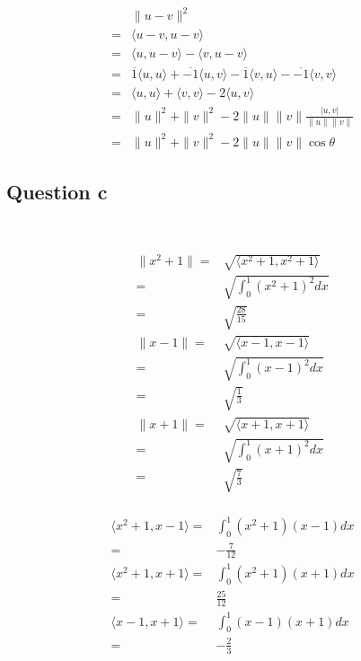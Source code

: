 \documentclass{article}
\begin{document}
~

\begin{equation*}
    \begin{split}
        &\|u-v\|^2\\
        =&\langle u-v,u-v\rangle\\
        =&\langle u,u-v\rangle-\langle v,u-v\rangle\\
        =&\overline{1}\langle u,u\rangle+\overline{-1}\langle u,v\rangle-\overline{1}\langle v,u\rangle-\overline{-1}\langle v,v\rangle\\
        =&\langle u,u\rangle+\langle v,v\rangle-2\langle u,v\rangle\\
        =&\|u\|^2+\|v\|^2-2\|u\|\|v\|\frac{|u,v|}{\|u\|\|v\|}\\
        =&\|u\|^2+\|v\|^2-2\|u\|\|v\|\cos \theta
    \end{split}
\end{equation*}

\subsection{Question c}

~

\begin{equation*}
    \begin{split}
        \|x^2+1\|=&\sqrt{\langle x^2+1,x^2+1\rangle}\\
        =&\sqrt{\int_{0}^{1}(x^2+1)^2dx}\\
        =&\sqrt{\frac{28}{15}}\\
        \|x-1\|=&\sqrt{\langle x-1,x-1\rangle}\\
        =&\sqrt{\int_{0}^{1}(x-1)^2dx}\\
        =&\sqrt{\frac{1}{3}}\\
        \|x+1\|=&\sqrt{\langle x+1,x+1\rangle}\\
        =&\sqrt{\int_{0}^{1}(x+1)^2dx}\\
        =&\sqrt{\frac{7}{3}}\\
    \end{split}
\end{equation*}

\begin{equation*}
    \begin{split}
        \langle x^2+1,x-1\rangle=&\int_{0}^{1}(x^2+1)(x-1)dx\\
        =&-\frac{7}{12}\\
        \langle x^2+1,x+1\rangle=&\int_{0}^{1}(x^2+1)(x+1)dx\\
        =&\frac{25}{12}\\
        \langle x-1,x+1\rangle=&\int_{0}^{1}(x-1)(x+1)dx\\
        =&-\frac{2}{3}\\
    \end{split}
\end{equation*}
\end{document}
